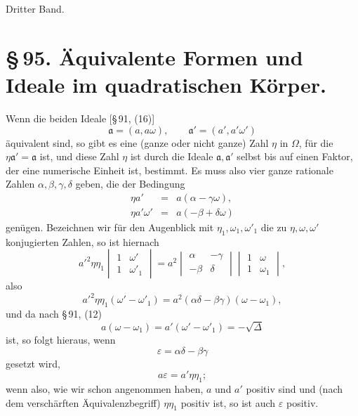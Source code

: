 \documentclass[11pt]{article}
\begin{document}
\begin{center}{\large Dritter Band.}\end{center}
\section*{\S\,95. Äquivalente Formen und Ideale im quadratischen Körper.}

Wenn die beiden Ideale [\S\,91, (16)]
\begin{equation}
 \mathfrak a=(a,a\omega),\qquad \mathfrak a'=(a',a'\omega')
\tag{1}
\end{equation}
äquivalent sind, so gibt es eine (ganze oder nicht ganze) Zahl $\eta$ in $\Omega$, für die $\eta\mathfrak a'=\mathfrak a$ ist, und diese Zahl $\eta$ ist durch die Ideale $\mathfrak a,\mathfrak a'$ selbst bis auf einen Faktor, der eine numerische Einheit ist, bestimmt. Es muss also vier ganze rationale Zahlen $\alpha,\beta,\gamma,\delta$ geben, die der Bedingung
\begin{equation}
\begin{array}{rcl}
 \eta a'&=&a(\alpha-\gamma\omega),\\
 \eta a'\omega'&=&a(-\beta+\delta\omega)
\end{array}
\tag{2}
\end{equation}
genügen. Bezeichnen wir für den Augenblick mit $\eta_1,\omega_1,\omega'_1$ die zu $\eta,\omega,\omega'$ konjugierten Zahlen, so ist hiernach
\[
 a'^2\eta\eta_1
 \begin{vmatrix}1&\omega'\\[0.15em]1&\omega'_1\end{vmatrix}
 =a^2
 \begin{vmatrix}\alpha&-\gamma\\[0.15em]-\beta&\delta\end{vmatrix}
 \begin{vmatrix}1&\omega\\[0.15em]1&\omega_1\end{vmatrix},
\]
also
\[
 a'^2\eta\eta_1(\omega'-\omega'_1)=a^2(\alpha\delta-\beta\gamma)(\omega-\omega_1),
\]
und da nach \S\,91, (12)
\[
 a(\omega-\omega_1)=a'(\omega'-\omega'_1)=-\sqrt{\Delta}
\]
ist, so folgt hieraus, wenn
\[
 \varepsilon=\alpha\delta-\beta\gamma
\]
gesetzt wird,
\begin{equation}
 a\varepsilon=a'\eta\eta_1;
\tag{3}
\end{equation}
wenn also, wie wir schon angenommen haben, $a$ und $a'$ positiv sind und (nach dem verschärften Äquivalenzbegriff) $\eta\eta_1$ positiv ist, so ist auch $\varepsilon$ positiv.
\end{document}
